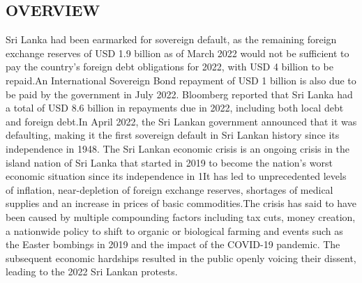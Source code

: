 \documentclass[a4paper,12pt]{article}
\begin{document}
\subsection{OVERVIEW}
\large
Sri Lanka had been earmarked for sovereign default, as the remaining foreign exchange reserves of USD 1.9 billion as of March 2022 would not be sufficient to pay the country's foreign debt obligations for 2022, with USD 4 billion to be repaid.An International Sovereign Bond repayment of USD 1 billion is also due to be paid by the government in July 2022. Bloomberg reported that Sri Lanka had a total of USD 8.6 billion in repayments due in 2022, including both local debt and foreign debt.In April 2022, the Sri Lankan government announced that it was defaulting, making it the first sovereign default in Sri Lankan history since its independence in 1948.\newline
The Sri Lankan economic crisis is an ongoing crisis in the island nation of Sri Lanka that started in 2019 to become the nation's worst economic situation since its independence in 1It has led to unprecedented levels of inflation, near-depletion of foreign exchange reserves, shortages of medical supplies and an increase in prices of basic commodities.The crisis has said to have been caused by multiple compounding factors including tax cuts, money creation, a nationwide policy to shift to organic or biological farming and events such as the Easter bombings in 2019 and the impact of the COVID-19 pandemic. The subsequent economic hardships resulted in the public openly voicing their dissent, leading to the 2022 Sri Lankan protests.
\end{document}
